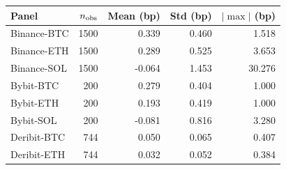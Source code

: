 \begin{tabular}{@{}lrrrr@{}}
\toprule
Panel & $n_{\rm obs}$ & Mean (bp) & Std (bp) & $|\!\max\!|$ (bp) \\
\midrule
Binance-BTC & 1500 & 0.339 & 0.460 & 1.518 \\
Binance-ETH & 1500 & 0.289 & 0.525 & 3.653 \\
Binance-SOL & 1500 & -0.064 & 1.453 & 30.276 \\
Bybit-BTC & 200 & 0.279 & 0.404 & 1.000 \\
Bybit-ETH & 200 & 0.193 & 0.419 & 1.000 \\
Bybit-SOL & 200 & -0.081 & 0.816 & 3.280 \\
Deribit-BTC & 744 & 0.050 & 0.065 & 0.407 \\
Deribit-ETH & 744 & 0.032 & 0.052 & 0.384 \\
\bottomrule
\end{tabular}